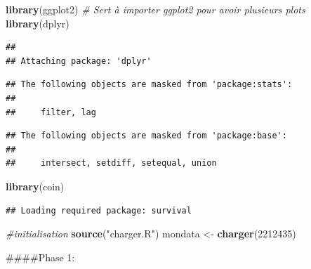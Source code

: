 \documentclass[
]{article}
\author{}
\date{\vspace{-2.5em}}
\newenvironment{Shaded}{\begin{snugshade}}{\end{snugshade}}
\newcommand{\CommentTok}[1]{\textcolor[rgb]{0.56,0.35,0.01}{\textit{#1}}}
\newcommand{\DecValTok}[1]{\textcolor[rgb]{0.00,0.00,0.81}{#1}}
\newcommand{\FunctionTok}[1]{\textcolor[rgb]{0.13,0.29,0.53}{\textbf{#1}}}
\newcommand{\NormalTok}[1]{#1}
\newcommand{\OtherTok}[1]{\textcolor[rgb]{0.56,0.35,0.01}{#1}}
\newcommand{\StringTok}[1]{\textcolor[rgb]{0.31,0.60,0.02}{#1}}
\begin{document}
\begin{Shaded}
\begin{Highlighting}[]
\FunctionTok{library}\NormalTok{(ggplot2) }\CommentTok{\# Sert à importer ggplot2 pour avoir plusieurs plots}
\FunctionTok{library}\NormalTok{(dplyr)}
\end{Highlighting}
\end{Shaded}

\begin{verbatim}
## 
## Attaching package: 'dplyr'
\end{verbatim}

\begin{verbatim}
## The following objects are masked from 'package:stats':
## 
##     filter, lag
\end{verbatim}

\begin{verbatim}
## The following objects are masked from 'package:base':
## 
##     intersect, setdiff, setequal, union
\end{verbatim}

\begin{Shaded}
\begin{Highlighting}[]
\FunctionTok{library}\NormalTok{(coin)}
\end{Highlighting}
\end{Shaded}

\begin{verbatim}
## Loading required package: survival
\end{verbatim}

\begin{Shaded}
\begin{Highlighting}[]
\CommentTok{\#initialisation}
\FunctionTok{source}\NormalTok{(}\StringTok{"charger.R"}\NormalTok{)}
\NormalTok{mondata }\OtherTok{\textless{}{-}} \FunctionTok{charger}\NormalTok{(}\DecValTok{2212435}\NormalTok{)}
\end{Highlighting}
\end{Shaded}

\#\#\#\#Phase 1:
\end{document}
